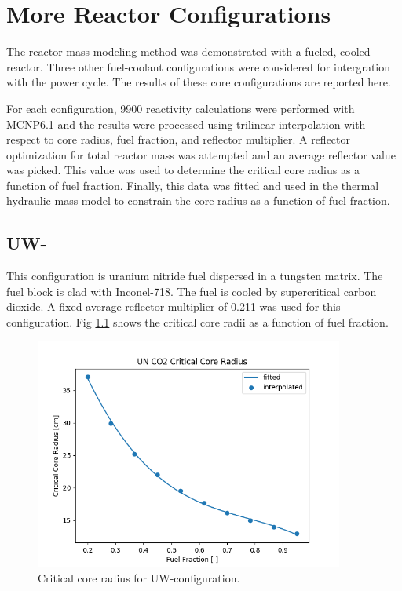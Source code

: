 \chapter{More Reactor Configurations}\label{ch:appendix-a}

The reactor mass modeling method was demonstrated with a \uox fueled, \codiox
cooled reactor. Three other fuel-coolant configurations were considered for
intergration with the power cycle. The results of these core configurations are
reported here.

For each configuration, 9900 reactivity calculations were performed with
MCNP6.1 and the \keff results were processed using trilinear interpolation with
respect to core radius, fuel fraction, and reflector multiplier. A reflector
optimization for total reactor mass was attempted and an average reflector value
was picked. This value was used to determine the critical core radius as a
function of fuel fraction. Finally, this data was fitted and used in the thermal
hydraulic mass model to constrain the core radius as a function of fuel
fraction.

\section{UW-\codiox}
This configuration is uranium nitride fuel dispersed in a tungsten matrix. The
fuel block is clad with Inconel-718. The
fuel is cooled by supercritical carbon dioxide. A fixed average reflector
multiplier of 0.211 was used for this configuration. Fig \ref{fig:core_r_un_co2}
shows the critical core radii as a function of fuel fraction.

\begin{figure}[h]
    \centering
    \includegraphics[width=4in]{../images/core_r_un_co2.png}
\caption{Critical core radius for UW-\codiox configuration.}
\label{fig:core_r_un_co2}
\end{figure}


